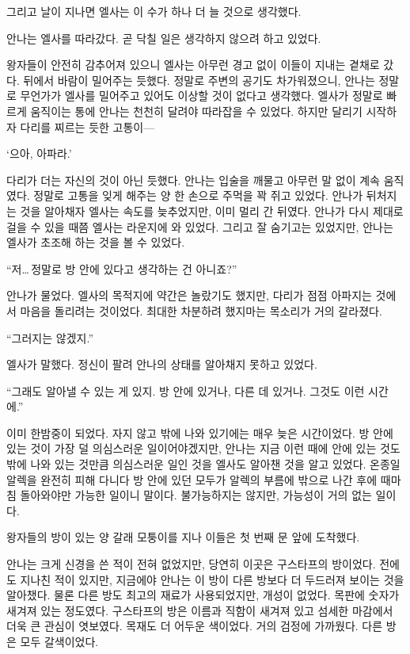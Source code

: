 그리고 날이 지나면 엘사는 이 수가 하나 더 늘 것으로 생각했다.

\textbreak

안나는 엘사를 따라갔다. 곧 닥칠 일은 생각하지 않으려 하고 있었다.

왕자들이 안전히 감추어져 있으니 엘사는 아무런 경고 없이 이들이 지내는 곁채로 갔다. 뒤에서 바람이 밀어주는 듯했다. 정말로 주변의 공기도 차가워졌으니, 안나는 정말로 무언가가 엘사를 밀어주고 있어도 이상할 것이 없다고 생각했다. 엘사가 정말로 빠르게 움직이는 통에 안나는 천천히 달려야 따라잡을 수 있었다. 하지만 달리기 시작하자 다리를 찌르는 듯한 고통이—

`으아, 아파라.'

다리가 더는 자신의 것이 아닌 듯했다. 안나는 입술을 깨물고 아무런 말 없이 계속 움직였다. 정말로 고통을 잊게 해주는 양 한 손으로 주먹을 꽉 쥐고 있었다. 안나가 뒤처지는 것을 알아채자 엘사는 속도를 늦추었지만, 이미 멀리 간 뒤였다. 안나가 다시 제대로 걸을 수 있을 때쯤 엘사는 라운지에 와 있었다. 그리고 잘 숨기고는 있었지만, 안나는 엘사가 초조해 하는 것을 볼 수 있었다.

``저\ldots\,정말로 방 안에 있다고 생각하는 건 아니죠?''

안나가 물었다. 엘사의 목적지에 약간은 놀랐기도 했지만, 다리가 점점 아파지는 것에서 마음을 돌리려는 것이었다. 최대한 차분하려 했지마는 목소리가 거의 갈라졌다.

``그러지는 않겠지.''

엘사가 말했다. 정신이 팔려 안나의 상태를 알아채지 못하고 있었다.

``그래도 알아낼 수 있는 게 있지. 방 안에 있거나, 다른 데 있거나. 그것도 이런 시간에.''

이미 한밤중이 되었다. 자지 않고 밖에 나와 있기에는 매우 늦은 시간이었다. 방 안에 있는 것이 가장 덜 의심스러운 일이어야겠지만, 안나는 지금 이런 때에 안에 있는 것도 밖에 나와 있는 것만큼 의심스러운 일인 것을 엘사도 알아챈 것을 알고 있었다. 온종일 알렉을 완전히 피해 다니다 방 안에 있던 모두가 알렉의 부름에 밖으로 나간 후에 때마침 돌아와야만 가능한 일이니 말이다. 불가능하지는 않지만, 가능성이 거의 없는 일이다.

왕자들의 방이 있는 양 갈래 모퉁이를 지나 이들은 첫 번째 문 앞에 도착했다.

안나는 크게 신경을 쓴 적이 전혀 없었지만, 당연히 이곳은 구스타프의 방이었다. 전에도 지나친 적이 있지만, 지금에야 안나는 이 방이 다른 방보다 더 두드러져 보이는 것을 알아챘다. 물론 다른 방도 최고의 재료가 사용되었지만, 개성이 없었다. 목판에 숫자가 새겨져 있는 정도였다. 구스타프의 방은 이름과 직함이 새겨져 있고 섬세한 마감에서 더욱 큰 관심이 엿보였다. 목재도 더 어두운 색이었다. 거의 검정에 가까웠다. 다른 방은 모두 갈색이었다.

